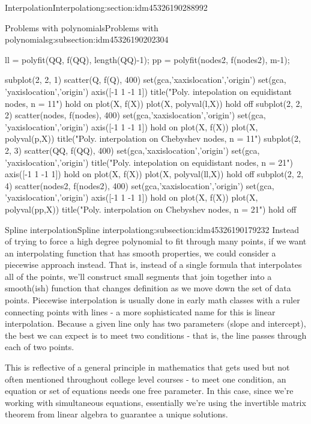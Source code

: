 \documentclass[oneside,10pt,]{article}
\numberwithin{equation}{section}
\numberwithin{equation}{section}
\begin{document}
\begin{sectionptx}{Interpolation}{}{Interpolation}{}{}{g:section:idm45326190288992}
\begin{subsectionptx}{Problems with polynomials}{}{Problems with polynomials}{}{}{g:subsection:idm45326190202304}
\begin{sageinput}
ll = polyfit(QQ, f(QQ), length(QQ)-1);
pp = polyfit(nodes2, f(nodes2), m-1);

subplot(2, 2, 1)
scatter(Q, f(Q), 400)
set(gca,'xaxislocation','origin')
set(gca, 'yaxislocation','origin')
axis([-1 1 -1 1])
title("Poly. intepolation on equidistant nodes, n = 11")
hold on
plot(X, f(X))
plot(X, polyval(l,X))
hold off
subplot(2, 2, 2)
scatter(nodes, f(nodes), 400)
set(gca,'xaxislocation','origin')
set(gca, 'yaxislocation','origin')
axis([-1 1 -1 1])
hold on
plot(X, f(X))
plot(X, polyval(p,X))
title("Poly. interpolation on Chebyshev nodes, n = 11")
subplot(2, 2, 3)
scatter(QQ, f(QQ), 400)
set(gca,'xaxislocation','origin')
set(gca, 'yaxislocation','origin')
title("Poly. intepolation on equidistant nodes, n = 21")
axis([-1 1 -1 1])
hold on
plot(X, f(X))
plot(X, polyval(ll,X))
hold off
subplot(2, 2, 4)
scatter(nodes2, f(nodes2), 400)
set(gca,'xaxislocation','origin')
set(gca, 'yaxislocation','origin')
axis([-1 1 -1 1])
hold on
plot(X, f(X))
plot(X, polyval(pp,X))
title("Poly. interpolation on Chebyshev nodes, n = 21")
hold off
\end{sageinput}
\end{subsectionptx}
%
%
\typeout{************************************************}
\typeout{************************************************}
%
\begin{subsectionptx}{Spline interpolation}{}{Spline interpolation}{}{}{g:subsection:idm45326190179232}
Instead of trying to force a high degree polynomial to fit through many points, if we want an interpolating function that has smooth properties, we could consider a piecewise approach instead. That is, instead of a single formula that interpolates all of the points, we'll construct small segments that join together into a smooth(ish) function that changes definition as we move down the set of data points. Piecewise interpolation is usually done in early math classes with a ruler connecting points with lines - a more sophisticated name for this is linear interpolation. Because a given line only has two parameters (slope and intercept), the best we can expect is to meet two conditions - that is, the line passes through each of two points.%
\par
This is reflective of a general principle in mathematics that gets used but not often mentioned throughout college level courses - to meet one condition, an equation or set of equations needs one free parameter. In this case, since we're working with simultaneous equations, essentially we're using the invertible matrix theorem from linear algebra to guarantee a unique solutions.%

\end{subsectionptx}
\end{sectionptx}
\end{document}
